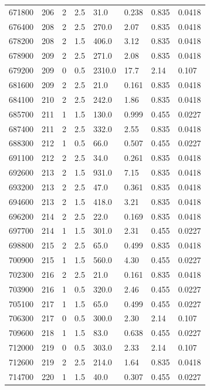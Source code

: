 \documentclass[preview]{standalone}
\begin{document}
{{{{{{{{{\begin{tabular}{L{1.2cm}C{1.2cm} C{0.3cm}C{0.5cm} C{1.4cm}C{1.4cm} C{1.4cm}C{1.4cm}}
  671800  &   206  & 2     & 2.5 &  31.0  & 0.238  & 0.835 &  0.0418   \\ 
  676400  &   208  & 2     & 2.5 &  270.0  & 2.07  & 0.835 &  0.0418   \\ 
  678200  &   208  & 2     & 1.5 &  406.0  & 3.12  & 0.835 &  0.0418   \\ 
  678900  &   209  & 2     & 2.5 &  271.0  & 2.08  & 0.835 &  0.0418   \\ 
  679200  &   209  & 0     & 0.5 &  2310.0  & 17.7  & 2.14 &  0.107   \\ 
  681600  &   209  & 2     & 2.5 &  21.0  & 0.161  & 0.835 &  0.0418   \\ 
  684100  &   210  & 2     & 2.5 &  242.0  & 1.86  & 0.835 &  0.0418   \\ 
  685700  &   211  & 1     & 1.5 &  130.0  & 0.999  & 0.455 &  0.0227   \\ 
  687400  &   211  & 2     & 2.5 &  332.0  & 2.55  & 0.835 &  0.0418   \\ 
  688300  &   212  & 1     & 0.5 &  66.0  & 0.507  & 0.455 &  0.0227   \\ 
  691100  &   212  & 2     & 2.5 &  34.0  & 0.261  & 0.835 &  0.0418   \\ 
  692600  &   213  & 2     & 1.5 &  931.0  & 7.15  & 0.835 &  0.0418   \\ 
  693200  &   213  & 2     & 2.5 &  47.0  & 0.361  & 0.835 &  0.0418   \\ 
  694600  &   213  & 2     & 1.5 &  418.0  & 3.21  & 0.835 &  0.0418   \\ 
  696200  &   214  & 2     & 2.5 &  22.0  & 0.169  & 0.835 &  0.0418   \\ 
  697700  &   214  & 1     & 1.5 &  301.0  & 2.31  & 0.455 &  0.0227   \\ 
  698800  &   215  & 2     & 2.5 &  65.0  & 0.499  & 0.835 &  0.0418   \\ 
  700900  &   215  & 1     & 1.5 &  560.0  & 4.30  & 0.455 &  0.0227   \\ 
  702300  &   216  & 2     & 2.5 &  21.0  & 0.161  & 0.835 &  0.0418   \\ 
  703900  &   216  & 1     & 0.5 &  320.0  & 2.46  & 0.455 &  0.0227   \\ 
  705100  &   217  & 1     & 1.5 &  65.0  & 0.499  & 0.455 &  0.0227   \\ 
  706300  &   217  & 0     & 0.5 &  300.0  & 2.30  & 2.14 &  0.107   \\ 
  709600  &   218  & 1     & 1.5 &  83.0  & 0.638  & 0.455 &  0.0227   \\ 
  712000  &   219  & 0     & 0.5 &  303.0  & 2.33  & 2.14 &  0.107   \\ 
  712600  &   219  & 2     & 2.5 &  214.0  & 1.64  & 0.835 &  0.0418   \\ 
  714700  &   220  & 1     & 1.5 &  40.0  & 0.307  & 0.455 &  0.0227   \\ 
\hline 
\end{tabular} 

}}}}}}}}}
\end{document}
